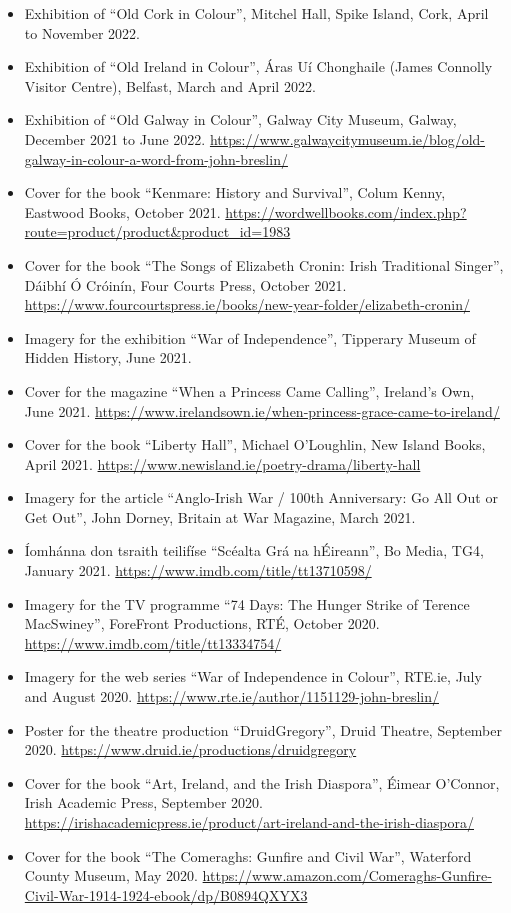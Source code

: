 \documentclass[10pt,a4paper]{res} %
\begin{document}
\begin{resume}
\begin{itemize}
\item Exhibition of ``Old Cork in Colour'', Mitchel Hall, Spike Island, Cork, April to November 2022.
\item Exhibition of ``Old Ireland in Colour'', \'{A}ras U\'{i} Chonghaile (James Connolly Visitor Centre), Belfast, March and April 2022.
\item Exhibition of ``Old Galway in Colour'', Galway City Museum, Galway, December 2021 to June 2022. \url{https://www.galwaycitymuseum.ie/blog/old-galway-in-colour-a-word-from-john-breslin/}
\item Cover for the book ``Kenmare: History and Survival'', Colum Kenny, Eastwood Books, October 2021. \url{https://wordwellbooks.com/index.php?route=product/product&product_id=1983}
\item Cover for the book ``The Songs of Elizabeth Cronin: Irish Traditional Singer'', D\'{a}ibh\'{i} \'{O} Cr\'{o}in\'{i}n, Four Courts Press, October 2021. \url{https://www.fourcourtspress.ie/books/new-year-folder/elizabeth-cronin/}
\item Imagery for the exhibition ``War of Independence'', Tipperary Museum of Hidden History, June 2021.
\item Cover for the magazine ``When a Princess Came Calling'', Ireland's Own, June 2021. \url{https://www.irelandsown.ie/when-princess-grace-came-to-ireland/} 
\item Cover for the book ``Liberty Hall'', Michael O'Loughlin, New Island Books, April 2021. \url{https://www.newisland.ie/poetry-drama/liberty-hall}
\item Imagery for the article ``Anglo-Irish War / 100th Anniversary: Go All Out or Get Out'', John Dorney, Britain at War Magazine, March 2021.
\item \'{I}omh\'{a}nna don tsraith teilif\'{i}se ``Sc\'{e}alta Gr\'{a} na h\'{E}ireann'', Bo Media, TG4, January 2021. \url{https://www.imdb.com/title/tt13710598/}
\item Imagery for the TV programme ``74 Days: The Hunger Strike of Terence MacSwiney'', ForeFront Productions, RT\'{E}, October 2020. \url{https://www.imdb.com/title/tt13334754/}
\item Imagery for the web series ``War of Independence in Colour'', RTE.ie, July and August 2020. \url{https://www.rte.ie/author/1151129-john-breslin/}
\item Poster for the theatre production ``DruidGregory'', Druid Theatre, September 2020. \url{https://www.druid.ie/productions/druidgregory}
\item Cover for the book ``Art, Ireland, and the Irish Diaspora'', \'{E}imear O'Connor, Irish Academic Press, September 2020. \url{https://irishacademicpress.ie/product/art-ireland-and-the-irish-diaspora/}
\item Cover for the book ``The Comeraghs: Gunfire and Civil War'', Waterford County Museum, May 2020. \url{https://www.amazon.com/Comeraghs-Gunfire-Civil-War-1914-1924-ebook/dp/B0894QXYX3}
\end{itemize}


\end{resume}
\end{document}
